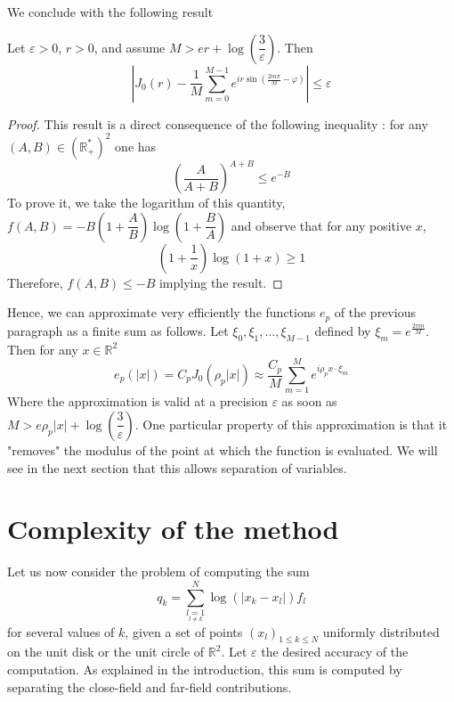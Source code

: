 \documentclass[11pt,a4paper]{article}
\begin{document}
We conclude with the following result
\begin{Prop} Let $\varepsilon >0$, $r>0$, and assume $M > er + \log\left(\dfrac{3}{\varepsilon}\right)$. Then 
\[\left|J_0(r) -  \dfrac{1}{M}\sum_{m=0}^{M-1}e^{ir\sin\left(\frac{2m\pi}{M}-\varphi\right)} \right| \leq \varepsilon \]
\begin{proof}
This result is a direct consequence of the following inequality : for any $(A,B) \in \left(\mathbb{R}_+^*\right)^2$ one has
\[ \left( \dfrac{A}{A+B}\right)^{A+B} \leq e^{-B}\]
To prove it, we take the logarithm of this quantity, $f(A,B) = -B\left(1+\dfrac{A}{B}\right)\log\left(1+\dfrac{B}{A}\right)$ and observe that for any positive $x$, \[\left(1+\dfrac{1}{x}\right)\log(1+x) \geq 1\]
Therefore, $f(A,B) \leq -B$ implying the result.  
\end{proof}
\end{Prop}

Hence, we can approximate very efficiently the functions $e_p$ of the previous paragraph as a finite sum as follows. Let $\xi_0, \xi_1, ..., \xi_{M-1}$ defined by $\xi_m = e^{\frac{2\pi m}{M}}$. Then for any $x \in \mathbb{R}^2$
\[ e_p(|x|) = C_p J_0(\rho_p |x|)\approx \dfrac{C_p}{M}\sum_{m=1}^M{e^{i \rho_px \cdot \xi_m}}\]
Where the approximation is valid at a precision $\varepsilon$ as soon as $M > e\rho_p|x| + \log\left(\dfrac{3}{\varepsilon}\right)$. One particular property of this approximation is that it "removes" the modulus of the point at which the function is evaluated. We will see in the next section that this allows separation of variables.   
\section{Complexity of the method}
Let us now consider the problem of computing the sum
\begin{equation}
 q_k = \sum_{\underset{l\neq k}{l=1}}^N \log(|x_k - x_l|)f_l 
\end{equation}
for several values of $k$, given a set of points $(x_l)_{1\leq k \leq N}$ uniformly distributed on the unit disk or the unit circle of $\mathbb{R}^2$. Let $\varepsilon$ the desired accuracy of the computation. 
As explained in the introduction, this sum is computed by separating the close-field and far-field contributions. 
\end{document}
